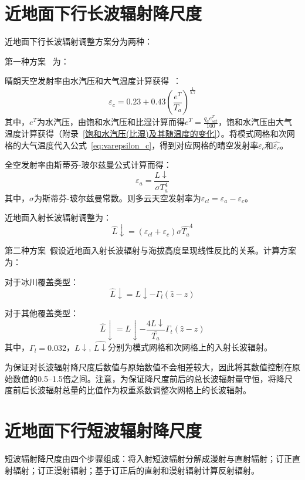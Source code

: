 \section{近地面下行长波辐射降尺度}
近地面下行长波辐射调整方案分为两种：

第一种方案~\citep{fiddes2014toposcale} 为：

晴朗天空发射率由水汽压和大气温度计算获得~\citep{konzelmann1994parameterization}：
\begin{equation}\label{eq:varepsilon_c}
\varepsilon_{c}=0.23+0.43 \left(\frac{e^{T}}{T_{a}}\right)^\frac{1}{5.7}
\end{equation}
其中，$e^{T}$为水汽压，由饱和水汽压和比湿计算而得$e^{T}= \frac{q_{a} e_{sat}^{T}}{100}$，饱和水汽压由大气温度计算获得（附录~\ref{饱和水汽压(比湿)及其随温度的变化}）。将模式网格和次网格的大气温度代入公式~\eqref{eq:varepsilon_c}，得到对应网格的晴空发射率$\varepsilon_c$和$\hat{\varepsilon_{c}}$。

全空发射率由斯蒂芬-玻尔兹曼公式计算而得： 
\begin{equation}
\varepsilon_{a}=\frac{L↓}{\sigma T_{a}^4}
\end{equation}
其中，$\sigma$为斯蒂芬-玻尔兹曼常数。则多云天空发射率为$\varepsilon_{cl}=\varepsilon_{a}-\varepsilon_{c}$。

近地面入射长波辐射调整为：
\begin{equation}
\hat{L}↓=\left(\varepsilon_{cl}+\varepsilon_{c}\right) \sigma \hat{T_{a}}^4
\end{equation}

第二种方案~\citep{Tricht2016}假设近地面入射长波辐射与海拔高度呈现线性反比的关系。计算方案为：

对于冰川覆盖类型：
\begin{equation}
\hat{L}↓=L↓-\Gamma_{l} \left(\hat{z}-z\right)       
\end{equation}

对于其他覆盖类型：
\begin{equation}
\hat{L}↓=L↓-\frac{4 L↓}{\bar{T_{a}}} \Gamma_{t} \left(\hat{z}-z\right)      
\end{equation}
其中，$\Gamma_{l}=0.032$，$L↓$, $\hat{L↓}$分别为模式网格和次网格上的入射长波辐射。

为保证对长波辐射降尺度后数值与原始数值不会相差较大，因此将其数值控制在原始数值的0.5--1.5倍之间。注意，为保证降尺度前后的总长波辐射量守恒，将降尺度前后长波辐射总量的比值作为权重系数调整次网格上的长波辐射。

\section{近地面下行短波辐射降尺度}
短波辐射降尺度由四个步骤组成：将入射短波辐射分解成漫射与直射辐射；订正直射辐射；订正漫射辐射；基于订正后的直射和漫射辐射计算反射辐射。

